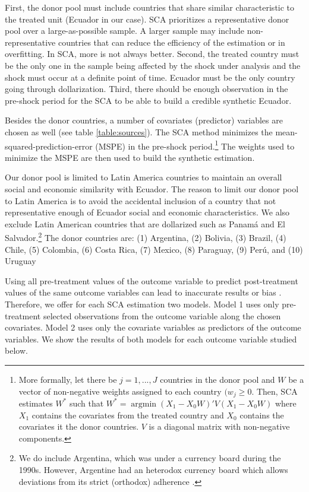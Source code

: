 \documentclass[12pt]{article}
\begin{document}
First, the donor pool must include countries that share similar characteristic to the treated unit (Ecuador in our case). SCA prioritizes a representative donor pool over a large-as-possible sample. A larger sample may include non-representative countries that can reduce the efficiency of the estimation or in overfitting. In SCA, more is not always better. Second, the treated country must be the only one in the sample being affected by the shock under analysis and the shock must occur at a definite point of time. Ecuador must be the only country going through dollarization. Third, there should be enough observation in the pre-shock period for the SCA to be able to build a credible synthetic Ecuador.

Besides the donor countries, a number of covariates (predictor) variables are chosen as well (see table \ref{table:sources}). The SCA method minimizes the mean-squared-prediction-error (MSPE) in the pre-shock period.\footnote{More formally, let there be $j = 1,...,J$ countries in the donor pool and $W$ be a vector of non-negative weights assigned to each country $(w_j \geq 0$. Then, SCA estimates $W^*$ such that $W^* = \operatorname{arg\min} (X_1 - X_0W)'V(X_1 - X_0W)$ where $X_1$ contains the covariates from the treated country and $X_0$ contains the covariates it the donor countries. $V$ is a diagonal matrix with non-negative components.} The weights used to minimize the MSPE are then used to build the synthetic estimation.

Our donor pool is limited to Latin America countries to maintain an overall social and economic similarity with Ecuador. The reason to limit our donor pool to Latin America is to avoid the accidental inclusion of a country that not representative enough of Ecuador social and economic characteristics. We also exclude Latin American countries that are dollarized such as Panamá and El Salvador.\footnote{We do include Argentina, which was under a currency board during the 1990s. However, Argentine had an heterodox currency board which allows deviations from its strict (orthodox) adherence \parencite{Hanke2008}.} The donor countries are: (1) Argentina, (2) Bolivia, (3) Brazil, (4) Chile, (5) Colombia, (6) Costa Rica, (7) Mexico, (8) Paraguay, (9) Perú, and (10) Uruguay



Using all pre-treatment values of the outcome variable to predict post-treatment values of the same outcome variables can lead to inaccurate results or bias \parencite{Ashok2015}. Therefore, we offer for each SCA estimation two models. Model 1 uses only pre-treatment selected observations from the outcome variable along the chosen covariates. Model 2 uses only the covariate variables as predictors of the outcome variables. We show the results of both models for each outcome variable studied below. 
\end{document}
